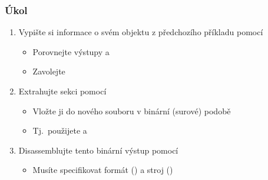 \begin{frame}
  \frametitle{Úkol}

  \begin{enumerate}
    \item Vypište si informace o svém objektu z předchozího příkladu pomocí
    \begin{itemize}
      \item Porovnejte výstupy  a 
      \item Zavolejte 
    \end{itemize}

    \pause

    \item Extrahujte  sekci pomocí 
    \begin{itemize}
      \item Vložte ji do nového souboru v binární (surové) podobě
      \item Tj.\ použijete  a 
    \end{itemize}

    \pause

    \item Disassemblujte tento binární výstup pomocí 
    \begin{itemize}
      \item Musíte specifikovat formát () a stroj
	()
    \end{itemize}

  \end{enumerate}
\end{frame}

